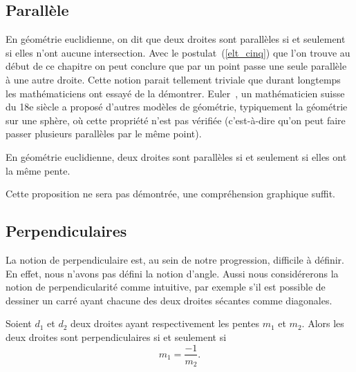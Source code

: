 \subsection{Parallèle}

En géométrie euclidienne, on dit que deux droites sont parallèles si et seulement si elles n'ont aucune intersection. Avec le postulat~(\ref{elt_cinq}) que l'on trouve au début de ce chapitre on peut conclure que par un point passe une seule parallèle à une autre droite. Cette notion parait tellement triviale que durant longtemps les mathématiciens ont essayé de la démontrer. Euler~, un mathématicien suisse du 18e siècle a proposé d'autres modèles de géométrie, typiquement la géométrie sur une sphère, où cette propriété n'est pas vérifiée (c'est-à-dire qu'on peut faire passer plusieurs parallèles par le même point).

\begin{proposition}
En géométrie euclidienne, deux droites sont parallèles si et seulement si elles ont la même pente.
\end{proposition}

Cette proposition ne sera pas démontrée, une compréhension graphique suffit.

\subsection{Perpendiculaires}

La notion de perpendiculaire est, au sein de notre progression, difficile à définir. En effet, nous n'avons pas défini la notion d'angle. Aussi nous considérerons la notion de perpendicularité comme intuitive, par exemple s'il est possible de dessiner un carré ayant chacune des deux droites sécantes comme diagonales.

\begin{proposition}
Soient $d_1$ et $d_2$ deux droites ayant respectivement les pentes $m_1$ et $m_2$. Alors les deux droites sont perpendiculaires si et seulement si
$$
m_1 = \frac{-1}{m_2}.
$$
\end{proposition}

